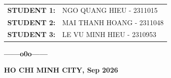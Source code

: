 \begin{titlepage}
\begin{center}
\begin{tabular}{l l}
    \end{tabular}

    \vspace{1cm}

    \begin{tabular}{l l}
        \textbf{STUDENT 1:} & NGO QUANG HIEU - 2311015 \\
        \textbf{STUDENT 2:} & MAI THANH HOANG - 2311048 \\
        \textbf{STUDENT 3:} & LE VU MINH HIEU - 2310953
    \end{tabular}

    \vspace{1cm}

    \textbf{------o0o------}

    \vspace{1.5cm}

    \textbf{HO CHI MINH CITY, Sep 2026}

\end{center}

\end{titlepage}

